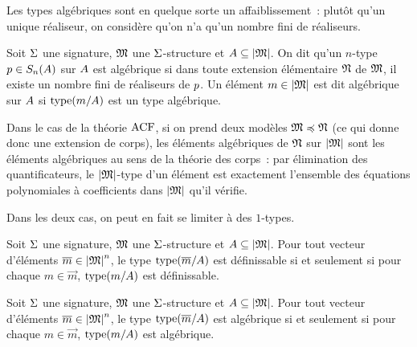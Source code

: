 Les types algébriques sont en quelque sorte un affaiblissement~: plutôt qu'un
unique réaliseur, on considère qu'on n'a qu'un nombre fini de réaliseurs.

\begin{definition}
  Soit $\Sigma$ une signature, $\mathfrak{M}$ une $\Sigma$-structure et
  $A\subseteq\left\vert \mathfrak{M}\right\vert$. On dit qu'un $n$-type $p\in S_{n}(A)$
  sur $A$ est algébrique si dans toute extension élémentaire $\mathfrak{N}$ de
  $\mathfrak{M}$, il existe un nombre fini de réaliseurs de $p$.
  Un élément $m \in \left\vert \mathfrak{M}\right\vert$ est dit algébrique sur $A$ si $\operatorname{type}(m/A)$
  est un type algébrique.
\end{definition}

\begin{remark}
  Dans le cas de la théorie $\operatorname{ACF}$, si on prend deux modèles
  $\mathfrak{M}\preccurlyeq\mathfrak{N}$ (ce qui donne donc une extension de corps), les
  éléments algébriques de $\mathfrak{N}$ sur $\left\vert \mathfrak{M}\right\vert$ sont les éléments algébriques
  au sens de la théorie des corps~: par élimination des quantificateurs, le
  $\left\vert \mathfrak{M}\right\vert$-type d'un élément est exactement l'ensemble des équations
  polynomiales à coefficients dans $\left\vert \mathfrak{M}\right\vert$ qu'il vérifie.
\end{remark}

\noindent
Dans les deux cas, on peut en fait se limiter à des $1$-types.

\begin{proposition}
  Soit $\Sigma$ une signature, $\mathfrak{M}$ une $\Sigma$-structure et
  $A\subseteq\left\vert \mathfrak{M}\right\vert$. Pour tout vecteur d'éléments $\overline{m}\in\left\vert \mathfrak{M}\right\vert^n$,
  le type $\operatorname{type}(\overline{m}/A)$ est définissable si et seulement si pour chaque
  $m \in \vec m$, $\operatorname{type}(m/A)$ est définissable.
\end{proposition}

\begin{proposition}
  Soit $\Sigma$ une signature, $\mathfrak{M}$ une $\Sigma$-structure et
  $A\subseteq\left\vert \mathfrak{M}\right\vert$. Pour tout vecteur d'éléments $\overline{m}\in\left\vert \mathfrak{M}\right\vert^n$,
  le type $\operatorname{type}(\overline{m}/A)$ est algébrique si et seulement si pour chaque
  $m \in \vec m$, $\operatorname{type}(m/A)$ est algébrique.
\end{proposition}

